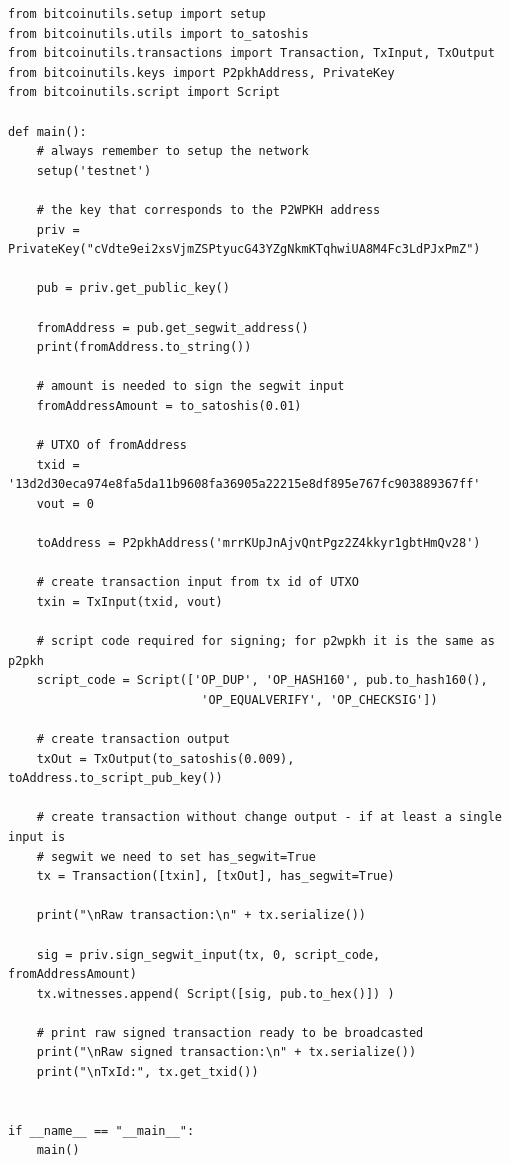 \vspace{1em}
\begin{lstlisting}[style=Python]
from bitcoinutils.setup import setup
from bitcoinutils.utils import to_satoshis
from bitcoinutils.transactions import Transaction, TxInput, TxOutput
from bitcoinutils.keys import P2pkhAddress, PrivateKey
from bitcoinutils.script import Script

def main():
    # always remember to setup the network
    setup('testnet')

    # the key that corresponds to the P2WPKH address
    priv = PrivateKey("cVdte9ei2xsVjmZSPtyucG43YZgNkmKTqhwiUA8M4Fc3LdPJxPmZ")

    pub = priv.get_public_key()

    fromAddress = pub.get_segwit_address()
    print(fromAddress.to_string())

    # amount is needed to sign the segwit input
    fromAddressAmount = to_satoshis(0.01)

    # UTXO of fromAddress
    txid = '13d2d30eca974e8fa5da11b9608fa36905a22215e8df895e767fc903889367ff'
    vout = 0

    toAddress = P2pkhAddress('mrrKUpJnAjvQntPgz2Z4kkyr1gbtHmQv28')

    # create transaction input from tx id of UTXO
    txin = TxInput(txid, vout)

    # script code required for signing; for p2wpkh it is the same as p2pkh
    script_code = Script(['OP_DUP', 'OP_HASH160', pub.to_hash160(),
                           'OP_EQUALVERIFY', 'OP_CHECKSIG'])

    # create transaction output
    txOut = TxOutput(to_satoshis(0.009), toAddress.to_script_pub_key())

    # create transaction without change output - if at least a single input is
    # segwit we need to set has_segwit=True
    tx = Transaction([txin], [txOut], has_segwit=True)

    print("\nRaw transaction:\n" + tx.serialize())

    sig = priv.sign_segwit_input(tx, 0, script_code, fromAddressAmount)
    tx.witnesses.append( Script([sig, pub.to_hex()]) )

    # print raw signed transaction ready to be broadcasted
    print("\nRaw signed transaction:\n" + tx.serialize())
    print("\nTxId:", tx.get_txid())


if __name__ == "__main__":
    main()
\end{lstlisting}
\vspace{1em}


